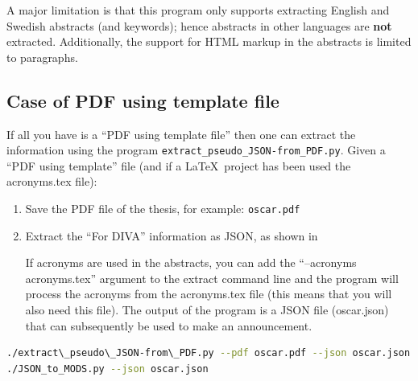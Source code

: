 A major limitation is that this program only supports extracting English and Swedish abstracts (and keywords); hence abstracts in other languages are \textbf{not} extracted. Additionally, the support for HTML markup in the abstracts is limited to paragraphs. 



\subsection{Case of PDF using template file}
\label{sec:extractingJSONPDF}
If all you have is a ``PDF using template file'' then one can extract the information using the program \texttt{extract\_pseudo\_JSON-from\_PDF.py}.  Given a ``PDF using template'' file (and if a \LaTeX~project has been used the acronyms.tex file):
\begin{enumerate}
    \item Save the PDF file of the thesis, for example: \texttt{oscar.pdf}
    \item Extract the “For DIVA” information as JSON, as shown in 
    
    If acronyms are used in the abstracts, you can add the “--acronyms acronyms.tex” argument to the extract command line and the program will process the acronyms from the acronyms.tex file (this means that you will also need this file). The output of the program is a JSON file (oscar.json) that can subsequently be used to make an announcement.
\end{enumerate}
\begin{lstlisting}[basicstyle=\footnotesize, language={bash}, caption={Commands to extract pseudo JSON from the PDF file for Oscar}, label=lst:AdminextractPseudoJSONFromPDFforOscarFileToJSON]    
./extract\_pseudo\_JSON-from\_PDF.py --pdf oscar.pdf --json oscar.json
./JSON_to_MODS.py --json oscar.json
\end{lstlisting}


